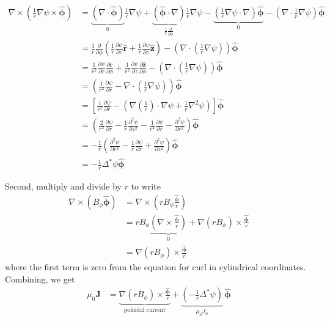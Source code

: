 \documentclass[11pt,a4paper]{article}
\begin{document}
    $$\begin{aligned}
        \nabla\times(\frac{1}{r}\nabla\psi\times\hat{\boldsymbol{\phi}}) &= \underbrace{(\nabla \cdot \hat{\boldsymbol{\phi}})}_{0}\frac{1}{r}\nabla\psi +\underbrace{(\hat{\boldsymbol{\phi}}\cdot\nabla)}_{\frac{1}{r}\frac{\partial}{\partial \phi}}\frac{1}{r}\nabla\psi - \underbrace{\left(\frac{1}{r}\nabla\psi \cdot \nabla\right)\hat{\boldsymbol{\phi}}}_{0} - \left(\nabla\cdot \frac{1}{r} \nabla\psi\right)\hat{\boldsymbol{\phi}}
        \\
        &= \frac{1}{r}\frac{\partial}{\partial\phi}\left(\frac{1}{r}\frac{\partial\psi}{\partial r} \mathbf{\hat{r}} + \frac{1}{r} \frac{\partial\psi}{\partial z}\mathbf{\hat{z}}\right)- \left(\nabla\cdot (\frac{1}{r} \nabla\psi)\right)\boldsymbol{\hat{\phi}} \\
        &= \frac{1}{r^2}\frac{\partial\psi}{\partial r} \frac{\partial\mathbf{\hat{r}}}{\partial\phi} + \frac{1}{r^2} \frac{\partial\psi}{\partial z}\frac{\partial\mathbf{\hat{z}}}{\partial\phi} - \left(\nabla\cdot (\frac{1}{r} \nabla\psi)\right)\boldsymbol{\hat{\phi}}\\
        &= \left(\frac{1}{r^2}\frac{\partial\psi}{\partial r} - \nabla\cdot (\frac{1}{r} \nabla\psi)\right)\boldsymbol{\hat{\phi}} \\
        &= \left[\frac{1}{r^2}\frac{\partial\psi}{\partial r} - \left(\nabla(\frac{1}{r}) \cdot \nabla\psi + \frac{1}{r} \nabla^2 \psi \right)\right] \hat{\boldsymbol{\phi}}\\
        &= \left(\frac{2}{r^2}\frac{\partial\psi}{\partial r}-\frac{1}{r}\frac{\partial^2\psi}{\partial z^2}-\frac{1}{r^2}\frac{\partial\psi}{\partial r}-\frac{\partial^2\psi}{\partial r^2}\right)\hat{\boldsymbol{\phi}} \\
        &= -\frac{1}{r}\left(\frac{\partial^2\psi}{\partial r^2}-\frac{1}{r}\frac{\partial\psi}{\partial r}+\frac{\partial^2\psi}{\partial z^2}\right)\hat{\boldsymbol{\phi}} \\
        &= -\frac{1}{r} \Delta ^* \psi \hat{\boldsymbol{\phi}}
    \end{aligned}
    $$

    Second, multiply and divide by $r$ to write 
    $$
    \begin{aligned}
        \nabla \times(B_\phi \hat{\boldsymbol{\phi}}) &= \nabla\times(rB_\phi\frac{\hat{\boldsymbol{\phi}}}{r}) \\
        &= rB_\phi\underbrace{(\nabla\times\frac{\hat{\boldsymbol{\phi}}}{r})}_{0}+\nabla(rB_\phi)\times\frac{\hat{\boldsymbol{\phi}}}{r} \\
        &= \nabla(rB_\phi)\times\frac{\hat{\boldsymbol{\phi}}}{r}
    \end{aligned}
    $$
    where the first term is zero from the equation for curl in cylindrical coordinates.
    Combining, we get
    $$\begin{aligned}
        \mu_0\mathbf{J}&=\underbrace{\nabla(rB_\phi)\times\frac{\hat{\boldsymbol{\phi}}}{r}}_{\text{poloidal current}}+ \underbrace{\left(-\frac{1}{r}\Delta^*\psi\right)}_{\mu_0J_\phi}\,\hat{\boldsymbol{\phi}}
    \end{aligned}
    $$
    
\end{document}

